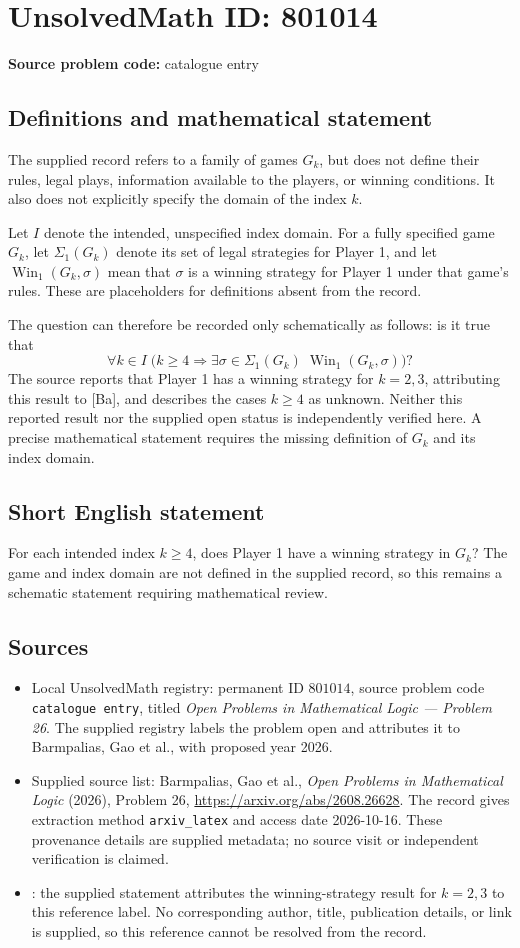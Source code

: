 \documentclass[11pt]{article}
\begin{document}
\section*{UnsolvedMath ID: 801014}
\textbf{Source problem code:} catalogue entry
\subsection{Definitions and mathematical statement}
The supplied record refers to a family of games \(G_k\), but does not define their rules, legal plays, information available to the players, or winning conditions. It also does not explicitly specify the domain of the index \(k\).

Let \(I\) denote the intended, unspecified index domain. For a fully specified game \(G_k\), let \(\Sigma_1(G_k)\) denote its set of legal strategies for Player 1, and let \(\operatorname{Win}_1(G_k,\sigma)\) mean that \(\sigma\) is a winning strategy for Player 1 under that game's rules. These are placeholders for definitions absent from the record.

The question can therefore be recorded only schematically as follows: is it true that
\[
\forall k\in I\;\bigl(k\geq 4\Longrightarrow \exists\sigma\in\Sigma_1(G_k)\;\operatorname{Win}_1(G_k,\sigma)\bigr)?
\]
The source reports that Player 1 has a winning strategy for \(k=2,3\), attributing this result to [Ba], and describes the cases \(k\geq4\) as unknown. Neither this reported result nor the supplied open status is independently verified here. A precise mathematical statement requires the missing definition of \(G_k\) and its index domain.
\subsection{Short English statement}
For each intended index \(k\geq4\), does Player 1 have a winning strategy in \(G_k\)? The game and index domain are not defined in the supplied record, so this remains a schematic statement requiring mathematical review.
\subsection{Sources}
\begin{itemize}
\item Local UnsolvedMath registry: permanent ID \(801014\), source problem code \texttt{catalogue entry}, titled \emph{Open Problems in Mathematical Logic --- Problem 26}. The supplied registry labels the problem open and attributes it to Barmpalias, Gao et al., with proposed year 2026.
\item Supplied source list: Barmpalias, Gao et al., \emph{Open Problems in Mathematical Logic} (2026), Problem 26, \url{https://arxiv.org/abs/2608.26628}. The record gives extraction method \texttt{arxiv\_latex} and access date 2026-10-16. These provenance details are supplied metadata; no source visit or independent verification is claimed.
\item [Ba]: the supplied statement attributes the winning-strategy result for \(k=2,3\) to this reference label. No corresponding author, title, publication details, or link is supplied, so this reference cannot be resolved from the record.
\end{itemize}
\end{document}
